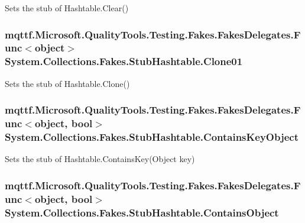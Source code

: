 Sets the stub of Hashtable.\-Clear()

\hypertarget{class_system_1_1_collections_1_1_fakes_1_1_stub_hashtable_af1703d33b1f0866a1473d65b00fdf1ad}{
\subsubsection[{Clone01}]{\setlength{\rightskip}{0pt plus 5cm}mqttf.\-Microsoft.\-Quality\-Tools.\-Testing.\-Fakes.\-Fakes\-Delegates.\-Func$<$object$>$ System.\-Collections.\-Fakes.\-Stub\-Hashtable.\-Clone01}}\label{class_system_1_1_collections_1_1_fakes_1_1_stub_hashtable_af1703d33b1f0866a1473d65b00fdf1ad}


Sets the stub of Hashtable.\-Clone()

\hypertarget{class_system_1_1_collections_1_1_fakes_1_1_stub_hashtable_a1b47db1d05625fbd1639df68ce621fd3}{
\subsubsection[{Contains\-Key\-Object}]{\setlength{\rightskip}{0pt plus 5cm}mqttf.\-Microsoft.\-Quality\-Tools.\-Testing.\-Fakes.\-Fakes\-Delegates.\-Func$<$object, bool$>$ System.\-Collections.\-Fakes.\-Stub\-Hashtable.\-Contains\-Key\-Object}}\label{class_system_1_1_collections_1_1_fakes_1_1_stub_hashtable_a1b47db1d05625fbd1639df68ce621fd3}


Sets the stub of Hashtable.\-Contains\-Key(\-Object key)

\hypertarget{class_system_1_1_collections_1_1_fakes_1_1_stub_hashtable_a4b0ff8b18b288408cde213fc24305878}{
\subsubsection[{Contains\-Object}]{\setlength{\rightskip}{0pt plus 5cm}mqttf.\-Microsoft.\-Quality\-Tools.\-Testing.\-Fakes.\-Fakes\-Delegates.\-Func$<$object, bool$>$ System.\-Collections.\-Fakes.\-Stub\-Hashtable.\-Contains\-Object}}\label{class_system_1_1_collections_1_1_fakes_1_1_stub_hashtable_a4b0ff8b18b288408cde213fc24305878}


